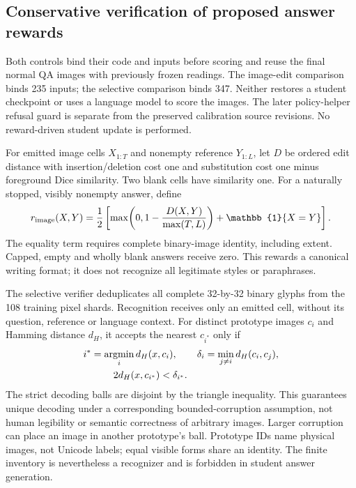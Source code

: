 \subsection*{Conservative verification of proposed answer rewards}

Both controls bind their code and inputs before scoring and reuse the final
normal QA images with previously frozen readings. The image-edit comparison
binds 235 inputs; the selective comparison binds 347. Neither restores a
student checkpoint or uses a language model to score the images. The later
policy-helper refusal guard is separate from the preserved calibration source
revisions. No reward-driven student update is performed.

For emitted image cells $X_{1:T}$ and nonempty reference $Y_{1:L}$, let $D$ be
ordered edit distance with insertion/deletion cost one and substitution cost
one minus foreground Dice similarity. Two blank cells have similarity one.
For a naturally stopped, visibly nonempty answer, define
\begin{equation}
 r_{\rm image}(X,Y)=\frac12\left[
 \max\!\left(0,1-\frac{D(X,Y)}{\max(T,L)}\right)
 +\mathbb{1}\{X=Y\}\right].
 \label{eq:answer-image-reward}
\end{equation}
The equality term requires complete binary-image identity, including extent.
Capped, empty and wholly blank answers receive zero. This rewards a canonical
writing format; it does not recognize all legitimate styles or paraphrases.

The selective verifier deduplicates all complete 32-by-32 binary glyphs from
the 108 training pixel shards. Recognition receives only an emitted cell,
without its question, reference or language context. For distinct prototype
images $c_i$ and Hamming distance $d_H$, it accepts the nearest $c_{i^*}$ only if
\begin{equation}
 \begin{aligned}
 i^*&=\mathop{\rm argmin}_i d_H(x,c_i),\qquad
 \delta_i=\min_{j\ne i}d_H(c_i,c_j),\\
 &\hspace{8mm}2d_H(x,c_{i^*})<\delta_{i^*}.
 \end{aligned}
 \label{eq:selective-glyph-verification}
\end{equation}
The strict decoding balls are disjoint by the triangle inequality. This
guarantees unique decoding under a corresponding bounded-corruption assumption,
not human legibility or semantic correctness of arbitrary images. Larger
corruption can place an image in another prototype's ball. Prototype IDs name
physical images, not Unicode labels; equal visible forms share an identity.
The finite inventory is nevertheless a recognizer and is forbidden in student
answer generation.

